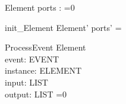 \begin{schema}{Element}
ports : \pset \nat 
{}=0
\end{schema}


\begin{zed}
init\_Element \sdef \lsch Element' \bbar ports' = \emptyset  \rsch  \end{zed}

\begin{schema}{ProcessEvent}
\Delta Element \\
event: EVENT \\
instance: ELEMENT \\
input: LIST \\
output: LIST 
=0
\end{schema}

